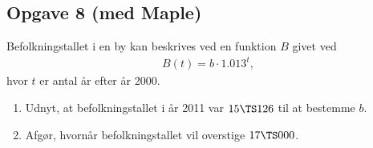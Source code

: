 \subsection*{Opgave 8 (med Maple)}
Befolkningstallet i en by kan beskrives ved en funktion $B$ givet ved
\begin{align*}
	B(t) = b\cdot 1.013^t,
\end{align*}
hvor $t$ er antal år efter år 2000. 
\begin{enumerate}[label=\roman*)]
	\item Udnyt, at befolkningstallet i år 2011 var $15\TS 126$ til at bestemme $b$. 
	\item Afgør, hvornår befolkningstallet vil overstige $17\TS 000$.
\end{enumerate}

